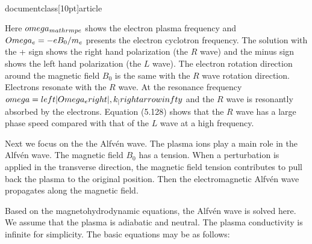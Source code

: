 \\documentclass[10pt]{article}
\begin{document}
{{{{Here $\\omega_{\\mathrm{pe}}$ shows the electron plasma frequency and $\\Omega_{e}=-e B_{0} / m_{e}$ presents the electron cyclotron frequency. The solution with the + sign shows the right hand polarization (the $R$ wave) and the minus sign shows the left hand polarization (the $L$ wave). The electron rotation direction around the magnetic field $B_{0}$ is the same with the $R$ wave rotation direction. Electrons resonate with the $R$ wave. At the resonance frequency $\\omega=\\left|\\Omega_{e}\\right|, k_{\\|} \\rightarrow \\infty$ and the $R$ wave is resonantly absorbed by the electrons. Equation (5.128) shows that the $R$ wave has a large phase speed compared with that of the $L$ wave at a high frequency.

Next we focus on the the Alfvén wave. The plasma ions play a main role in the Alfvén wave. The magnetic field $B_{0}$ has a tension. When a perturbation is applied in the transverse direction, the magnetic field tension contributes to pull back the plasma to the original position. Then the electromagnetic Alfvén wave propagates along the magnetic field.

Based on the magnetohydrodynamic equations, the Alfvén wave is solved here. We assume that the plasma is adiabatic and neutral. The plasma conductivity is infinite for simplicity. The basic equations may be as follows:


}}}}
\end{document}
